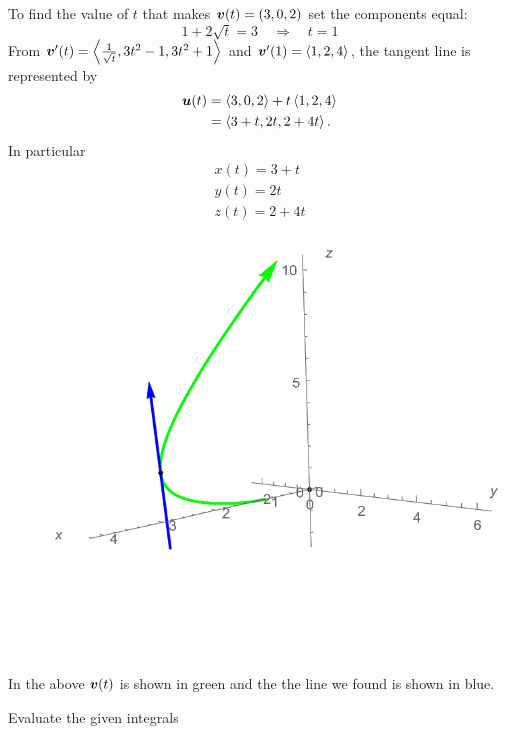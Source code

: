 \documentclass[12pt]{exam}
\newcommand{\bu}{\bm{u}}
\newcommand{\LR}[1]{\left(#1\right)}
\begin{document}
\begin{questions}
\ifprintanswers
        \begin{solution}
            To find the value of \(t\) that makes \(\bm{v}(t)=(3,0,2)\) set the components equal:
            \[
                1 + 2\sqrt{t}=3 \quad\Rightarrow\quad t=1
            \]
            From \(\bm{v}'(t)=\left\langle \frac{1}{\sqrt{t}},3t^2-1,3t^2+1 \right\rangle\) and \(\bm{v}'(1)=\left\langle 1,2,4 \right\rangle\), the tangent line is represented by 
            \begin{align*}
                \bu(t) & = \gen{3,0,2}+t\gen{1,2,4}\\
                    & = \gen{3+t,2t,2+4t}.
            \end{align*}
            In particular 
            \begin{gather*}
                x(t) = 3+t\\
                y(t) = 2t\\
                z(t) = 2+4t
            \end{gather*}
        \begin{center}
            \includegraphics[width=.5\textwidth]{hardthing.pdf}

            In the above \(\bm{v}(t)\) is shown in green and the the line we found is shown in blue.
        \end{center}
        \end{solution}
    \else
        \vfill
    \fi


\newpage 

\question Evaluate the given integrals
\end{questions}
\end{document}
